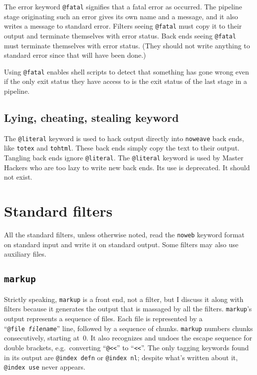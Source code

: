 \documentclass{article}
\makeatletter
\newcommand\kw[1]{\texttt{@#1}}
\newcommand\ikw[1]{\kw{index~#1}}
\makeatother
\begin{document}
The error keyword \kw{fatal} signifies that a fatal error as
occurred.
The pipeline stage originating such an error gives its own name and a
message, and it also writes a message to standard error.
Filters seeing \kw{fatal} must copy it to their output and terminate
themselves with error status.
Back ends seeing \kw{fatal} must terminate themselves with error
status. (They should not write anything to standard error since that
will have been done.)

Using \kw{fatal} enables shell scripts to detect
that something has gone wrong even if the only exit status they have
access to is the
exit status of the last stage in a pipeline.

\subsection{Lying, cheating, stealing keyword}

The \kw{literal} keyword is used to hack output directly into \texttt{noweave}
back ends, like \texttt{totex} and \texttt{tohtml}.
These back ends simply copy the text to their output.
Tangling back ends ignore \kw{literal}.
The \kw{literal} keyword is used by Master Hackers who are too lazy to
write new back ends.
Its use is deprecated.
It should not exist.





\section{Standard filters}

All the standard filters, unless otherwise noted, read the {\tt noweb}
keyword format on standard input and write it on standard output.
Some filters may also use auxiliary files.

\subsection{\tt markup}

Strictly speaking, {\tt markup} is a front end, not a filter, but I
discuss it along with filters because it generates the output that is
massaged by all the filters.
{\tt markup}'s output represents a sequence of files.
Each file is represented by a ``{\tt @file~{\rm\it filename}}'' line,
followed by a sequence of chunks.
{\tt markup} numbers chunks consecutively, starting at~0.
It also recognizes and undoes the escape sequence for double brackets,
e.g.~converting ``{\tt @<<}'' to ``{\tt <<}''.
The only tagging keywords found in its output are \ikw{defn} or
\ikw{nl}; despite what's written about it, \ikw{use} never appears.
\end{document}
